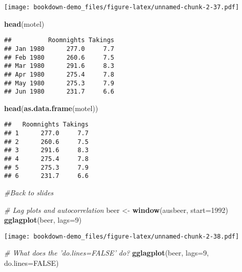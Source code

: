 \documentclass[]{book}
\newenvironment{Shaded}{\begin{snugshade}}{\end{snugshade}}
\newcommand{\CommentTok}[1]{\textcolor[rgb]{0.56,0.35,0.01}{\textit{#1}}}
\newcommand{\DataTypeTok}[1]{\textcolor[rgb]{0.13,0.29,0.53}{#1}}
\newcommand{\DecValTok}[1]{\textcolor[rgb]{0.00,0.00,0.81}{#1}}
\newcommand{\KeywordTok}[1]{\textcolor[rgb]{0.13,0.29,0.53}{\textbf{#1}}}
\newcommand{\NormalTok}[1]{#1}
\newcommand{\OtherTok}[1]{\textcolor[rgb]{0.56,0.35,0.01}{#1}}
\newcommand{\StringTok}[1]{\textcolor[rgb]{0.31,0.60,0.02}{#1}}
\begin{document}
\texttt{[image: bookdown-demo\_files/figure-latex/unnamed-chunk-2-37.pdf]}

\begin{Shaded}
\begin{Highlighting}[]
  \KeywordTok{head}\NormalTok{(motel)}
\end{Highlighting}
\end{Shaded}

\begin{verbatim}
##          Roomnights Takings
## Jan 1980      277.0     7.7
## Feb 1980      260.6     7.5
## Mar 1980      291.6     8.3
## Apr 1980      275.4     7.8
## May 1980      275.3     7.9
## Jun 1980      231.7     6.6
\end{verbatim}

\begin{Shaded}
\begin{Highlighting}[]
  \KeywordTok{head}\NormalTok{(}\KeywordTok{as.data.frame}\NormalTok{(motel))}
\end{Highlighting}
\end{Shaded}

\begin{verbatim}
##   Roomnights Takings
## 1      277.0     7.7
## 2      260.6     7.5
## 3      291.6     8.3
## 4      275.4     7.8
## 5      275.3     7.9
## 6      231.7     6.6
\end{verbatim}

\begin{Shaded}
\begin{Highlighting}[]
\CommentTok{#Back to slides}
  
\CommentTok{# Lag plots and autocorrelation }
\NormalTok{  beer <-}\StringTok{ }\KeywordTok{window}\NormalTok{(ausbeer, }\DataTypeTok{start=}\DecValTok{1992}\NormalTok{)}
  \KeywordTok{gglagplot}\NormalTok{(beer, }\DataTypeTok{lags=}\DecValTok{9}\NormalTok{)}
\end{Highlighting}
\end{Shaded}

\texttt{[image: bookdown-demo\_files/figure-latex/unnamed-chunk-2-38.pdf]}

\begin{Shaded}
\begin{Highlighting}[]
  \CommentTok{# What does the 'do.lines=FALSE' do?}
  \KeywordTok{gglagplot}\NormalTok{(beer, }\DataTypeTok{lags=}\DecValTok{9}\NormalTok{, }\DataTypeTok{do.lines=}\OtherTok{FALSE}\NormalTok{)}
\end{Highlighting}
\end{Shaded}
\end{document}
